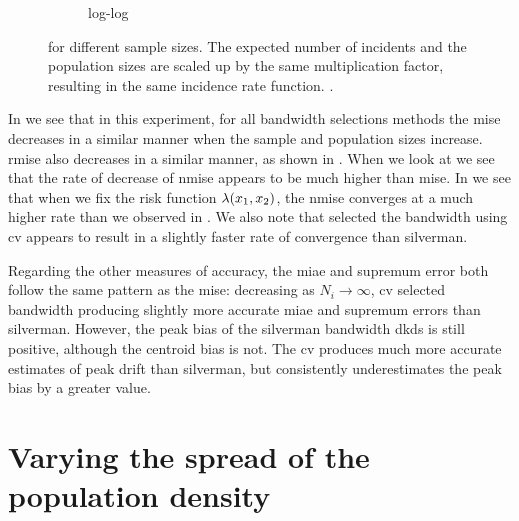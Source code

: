 \begin{figure}[htbp]
\begin{subfigure}[b]{0.49\textwidth}
        \caption{ log-log}
        \label{fig:ise:unifNpop_1h:nmise_log_log}
    \end{subfigure}
    \caption[: by incident and population size]
        { for different sample sizes.
        The expected number of incidents and the population sizes are scaled up by the same multiplication factor,
        resulting in the same incidence rate function.
        \errorplotcaption.}
    \label{fig:ise:unifNpop_1h}
\end{figure}

In  we see that in this experiment,
for all bandwidth selections methods the \gls{mise} decreases in a similar manner when the sample and population sizes increase.
\Gls{rmise} also decreases in a similar manner, as shown in .
When we look at  we see that the rate of decrease of \gls{nmise} appears to be much higher than \gls{mise}.
In  we see that when we fix the risk function $\lambda (x_1, x_2)$,
the \gls{nmise} converges at a much higher rate than we observed in .
We also note that selected the bandwidth using \gls{cv} appears to result in a slightly faster rate of convergence than \gls{silverman}.



Regarding the other measures of accuracy, the \gls{miae} and \gls{supremum error} both follow the same pattern as the \gls{mise}:
decreasing as $N_i \to \infty$,
\gls{cv} selected bandwidth producing slightly more accurate \gls{miae} and \glspl{supremum error} than \gls{silverman}.
However, the \gls{peak bias} of the \gls{silverman} bandwidth \glspl{dkd} is still positive, although the \gls{centroid bias} is not.
The \gls{cv} produces much more accurate estimates of \gls{peak drift} than \gls{silverman}, but consistently underestimates the \gls{peak bias} by a greater value.

\section{Varying the spread of the population density}
\label{sec:results:pop_spread}

